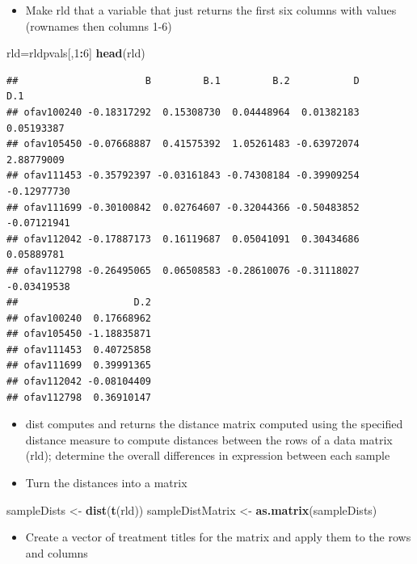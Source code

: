 \documentclass[
]{article}
\newenvironment{Shaded}{\begin{snugshade}}{\end{snugshade}}
\newcommand{\DecValTok}[1]{\textcolor[rgb]{0.00,0.00,0.81}{#1}}
\newcommand{\KeywordTok}[1]{\textcolor[rgb]{0.13,0.29,0.53}{\textbf{#1}}}
\newcommand{\NormalTok}[1]{#1}
\newcommand{\OperatorTok}[1]{\textcolor[rgb]{0.81,0.36,0.00}{\textbf{#1}}}
\newcommand{\StringTok}[1]{\textcolor[rgb]{0.31,0.60,0.02}{#1}}
\providecommand{\tightlist}{%
  \setlength{\itemsep}{0pt}\setlength{\parskip}{0pt}}
\begin{document}
\begin{itemize}
\tightlist
\item
  Make rld that a variable that just returns the first six columns with
  values (rownames then columns 1-6)
\end{itemize}

\begin{Shaded}
\begin{Highlighting}[]
\NormalTok{rld=rldpvals[,}\DecValTok{1}\OperatorTok{:}\DecValTok{6}\NormalTok{]}
\KeywordTok{head}\NormalTok{(rld)}
\end{Highlighting}
\end{Shaded}

\begin{verbatim}
##                      B         B.1         B.2           D         D.1
## ofav100240 -0.18317292  0.15308730  0.04448964  0.01382183  0.05193387
## ofav105450 -0.07668887  0.41575392  1.05261483 -0.63972074  2.88779009
## ofav111453 -0.35792397 -0.03161843 -0.74308184 -0.39909254 -0.12977730
## ofav111699 -0.30100842  0.02764607 -0.32044366 -0.50483852 -0.07121941
## ofav112042 -0.17887173  0.16119687  0.05041091  0.30434686  0.05889781
## ofav112798 -0.26495065  0.06508583 -0.28610076 -0.31118027 -0.03419538
##                    D.2
## ofav100240  0.17668962
## ofav105450 -1.18835871
## ofav111453  0.40725858
## ofav111699  0.39991365
## ofav112042 -0.08104409
## ofav112798  0.36910147
\end{verbatim}

\begin{itemize}
\tightlist
\item
  dist computes and returns the distance matrix computed using the
  specified distance measure to compute distances between the rows of a
  data matrix (rld); determine the overall differences in expression
  between each sample
\item
  Turn the distances into a matrix
\end{itemize}

\begin{Shaded}
\begin{Highlighting}[]
\NormalTok{sampleDists <-}\StringTok{ }\KeywordTok{dist}\NormalTok{(}\KeywordTok{t}\NormalTok{(rld))}
\NormalTok{sampleDistMatrix <-}\StringTok{ }\KeywordTok{as.matrix}\NormalTok{(sampleDists)}
\end{Highlighting}
\end{Shaded}

\begin{itemize}
\tightlist
\item
  Create a vector of treatment titles for the matrix and apply them to
  the rows and columns
\end{itemize}
\end{document}
